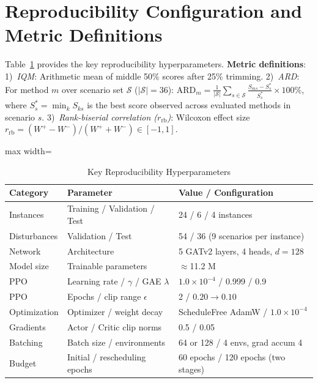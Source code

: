 \documentclass[journal,10pt]{IEEEtran}
\renewcommand{\arraystretch}{1.04}
\begin{document}
\section{Reproducibility Configuration and Metric Definitions}\label{app:reproducibility}

Table~\ref{tab:reproducibility} provides the key reproducibility hyperparameters. \textbf{Metric definitions}: 1)~\textit{IQM}: Arithmetic mean of middle 50\% scores after 25\% trimming. 2)~\textit{ARD}: For method $m$ over scenario set $\mathcal S$ ($|\mathcal S|=36$): $\mathrm{ARD}_m = \frac{1}{|\mathcal S|}\sum_{s\in\mathcal S} \frac{S_{ms}-S_s^*}{S_s^*}\times100\%$, where $S_s^*=\min_k S_{ks}$ is the best score observed across evaluated methods in scenario $s$. 3)~\textit{Rank-biserial correlation ($r_{\mathrm{rb}}$)}: Wilcoxon effect size $r_{\mathrm{rb}}=(W^+-W^-)/(W^++W^-)\in[-1,1]$.

\begin{table}[!t]
\centering
\caption{Key Reproducibility Hyperparameters}
\label{tab:reproducibility}
\setlength{\tabcolsep}{2.5pt}
\renewcommand{\arraystretch}{0.85}
\begin{adjustbox}{max width=\columnwidth}
\begin{tabular}{@{}llp{4.2cm}@{}}
\toprule
\textbf{Category} & \textbf{Parameter} & \textbf{Value / Configuration} \\
\midrule
Instances & Training / Validation / Test & 24 / 6 / 4 instances \\
Disturbances & Validation / Test & 54 / 36 (9 scenarios per instance) \\
Network & Architecture & 5 GATv2 layers, 4 heads, $d=128$ \\
Model size & Trainable parameters & $\approx$11.2 M \\
PPO & Learning rate / $\gamma$ / GAE $\lambda$ & $1.0\times10^{-4}$ / 0.999 / 0.9 \\
PPO & Epochs / clip range $\epsilon$ & 2 / $0.20\to0.10$ \\
Optimization & Optimizer / weight decay & ScheduleFree AdamW / $1.0\times10^{-4}$ \\
Gradients & Actor / Critic clip norms & 0.5 / 0.05 \\
Batching & Batch size / environments & 64 or 128 / 4 envs, grad accum 4 \\
Budget & Initial / rescheduling epochs & 60 epochs / 120 epochs (two stages) \\
\bottomrule
\end{tabular}
\end{adjustbox}
\end{table}
\end{document}
